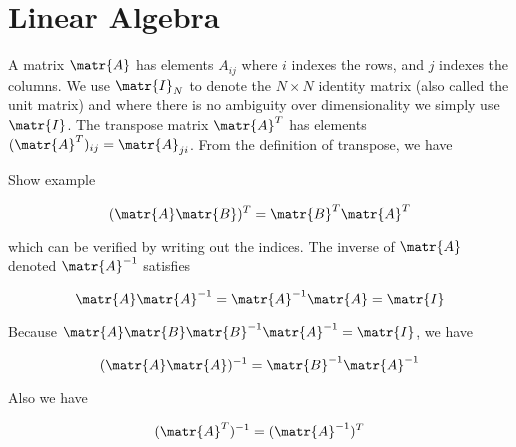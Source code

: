 \chapter{Linear Algebra}

A matrix $\matr{A}$ has elements $A_{ij}$ where $i$ indexes the rows, and $j$ indexes the columns. We use $\matr{I}_N$ to denote the $N \times N$ identity matrix (also called the unit matrix) and where there is no ambiguity over dimensionality we simply use $\matr{I}$. The transpose matrix $\matr{A}^T$ has elements $(\matr{A}^T)_{ij} = \matr{A}_{ji}$. From the definition of transpose, we have

\textcolor[rgb]{0.80,0.00,0.02}{Show example}

\begin{equation}\label{eq:transposedefinition}
  (\matr{A}\matr{B})^T = \matr{B}^T\matr{A}^T
\end{equation}

which can be verified by writing out the indices. The inverse of $\matr{A}$ denoted $\matr{A}^{-1}$ satisfies

\begin{equation}\label{eq:inversedefinition}
  \matr{A}\matr{A}^{-1} = \matr{A}^{-1}\matr{A} = \matr{I}
\end{equation}

Because $\matr{A}\matr{B}\matr{B}^{-1}\matr{A}^{-1} = \matr{I}$, we have

\begin{equation}\label{eq:inverseparantesedefinition}
  (\matr{A}\matr{A})^{-1} = \matr{B}^{-1}\matr{A}^{-1}
\end{equation}

Also we have

\begin{equation}\label{eq:inversetranposedefinition}
  (\matr{A}^T)^{-1} = (\matr{A}^{-1})^{T}
\end{equation}


